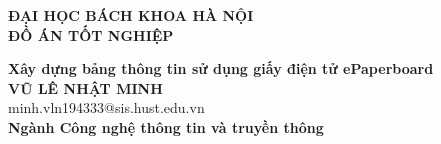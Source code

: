\documentclass[DoAn.tex]{subfiles}
\begin{document}
\begin{titlepage}
\thispagestyle{empty}
\begin{center}

{\textbf{\large{ĐẠI HỌC BÁCH KHOA HÀ NỘI}}}\\[4cm]

{\textbf{\huge{ ĐỒ ÁN TỐT NGHIỆP}}}\\[1cm]
{\textbf{\Large{Xây dựng bảng thông tin sử dụng giấy điện tử ePaperboard}}\\[1cm]

{\textbf{\large{VŨ LÊ NHẬT MINH}}}\\
{\large{minh.vln194333@sis.hust.edu.vn}}\\[0.5cm]

{\textbf{\large{Ngành Công nghệ thông tin và truyền thông}}}\\

\vspace{2cm}
\begin{table}[H]
\centering
{}
\end{table}}
\end{center}



\end{titlepage}
\end{document}

